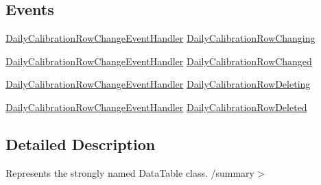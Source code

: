 \subsection*{Events}
\begin{DoxyCompactItemize}
\item 
\hyperlink{class_env_int_1_1_win32_1_1_field_tech_1_1_manager_1_1_data_sets_1_1_guide_ware_mobile_data_set_a6595251b6d65dffbbe61ca816dadb518}{Daily\+Calibration\+Row\+Change\+Event\+Handler} \hyperlink{class_env_int_1_1_win32_1_1_field_tech_1_1_manager_1_1_data_sets_1_1_guide_ware_mobile_data_set_5b380d875f3f569d74f6183f0c2ee8d7_a9cf35b37123f28ce925bc1c446090b06}{Daily\+Calibration\+Row\+Changing}
\item 
\hyperlink{class_env_int_1_1_win32_1_1_field_tech_1_1_manager_1_1_data_sets_1_1_guide_ware_mobile_data_set_a6595251b6d65dffbbe61ca816dadb518}{Daily\+Calibration\+Row\+Change\+Event\+Handler} \hyperlink{class_env_int_1_1_win32_1_1_field_tech_1_1_manager_1_1_data_sets_1_1_guide_ware_mobile_data_set_5b380d875f3f569d74f6183f0c2ee8d7_a0a648e451af0d43d0fbbdc5b60bc346f}{Daily\+Calibration\+Row\+Changed}
\item 
\hyperlink{class_env_int_1_1_win32_1_1_field_tech_1_1_manager_1_1_data_sets_1_1_guide_ware_mobile_data_set_a6595251b6d65dffbbe61ca816dadb518}{Daily\+Calibration\+Row\+Change\+Event\+Handler} \hyperlink{class_env_int_1_1_win32_1_1_field_tech_1_1_manager_1_1_data_sets_1_1_guide_ware_mobile_data_set_5b380d875f3f569d74f6183f0c2ee8d7_ac89167abbab2ffaacb6854e36490d5b2}{Daily\+Calibration\+Row\+Deleting}
\item 
\hyperlink{class_env_int_1_1_win32_1_1_field_tech_1_1_manager_1_1_data_sets_1_1_guide_ware_mobile_data_set_a6595251b6d65dffbbe61ca816dadb518}{Daily\+Calibration\+Row\+Change\+Event\+Handler} \hyperlink{class_env_int_1_1_win32_1_1_field_tech_1_1_manager_1_1_data_sets_1_1_guide_ware_mobile_data_set_5b380d875f3f569d74f6183f0c2ee8d7_a4ee69aa8309a194190980f54e95f00a0}{Daily\+Calibration\+Row\+Deleted}
\end{DoxyCompactItemize}


\subsection{Detailed Description}
Represents the strongly named Data\+Table class. /summary$>$ 


